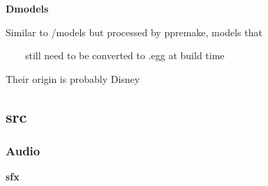 \documentclass[a4paper]{article}
\begin{document}
\clearpage
\bigskip


\bigskip


\bigskip

{\centering\sffamily\bfseries
\hypertarget{RefHeading18511167907073}{}Dmodels
\par}

{\centering\color{black}
Similar to /models but processed by ppremake, models that 
\par}

{\centering\color{black}
\ \ \ \ still need to be converted to .egg at build time
\par}

{\centering\color{black}
Their origin is probably Disney
\par}

\clearpage\subsection[src]{src}
\hypertarget{RefHeading18531167907073}{}
\bigskip

\clearpage\subsubsection[Audio]{Audio}
\hypertarget{RefHeading18551167907073}{}{\centering\bfseries
\hypertarget{RefHeading18571167907073}{}sfx
\par}
\end{document}
